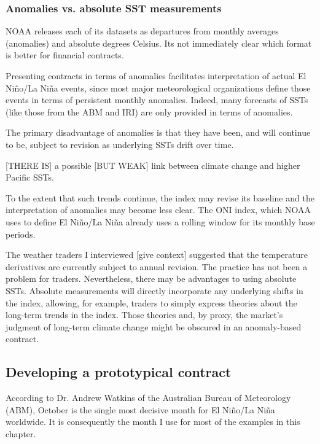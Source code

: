 \documentclass[authoryear]{article}
\begin{document}
\subsubsection{Anomalies vs. absolute SST measurements}
NOAA releases each of its datasets as departures from monthly averages (anomalies) and absolute degrees Celsius. Its not immediately clear which format is better for financial contracts.

Presenting contracts in terms of anomalies facilitates interpretation of actual El Ni\~no/La Ni\~na events, since most major meteorological organizations define those events in terms of persistent monthly anomalies. Indeed, many forecasts of SSTs (like those from the ABM and IRI) are only provided in terms of anomalies. 

The primary disadvantage of anomalies is that they have been, and will continue to be, subject to revision as underlying SSTs drift over time. 

[THERE IS] a possible [BUT WEAK] link between climate change and higher Pacific SSTs. 

To the extent that such trends continue, the index may revise its baseline and the interpretation of anomalies may become less clear. The ONI index, which NOAA uses to define El Ni\~no/La Ni\~na already uses a rolling window for its monthly base periods.

The weather traders I interviewed [give context] suggested that the temperature derivatives are currently subject to annual revision. The practice has not been a problem for traders. Nevertheless, there may be advantages to using absolute SSTs. Absolute measurements will directly incorporate any underlying shifts in the index, allowing, for example, traders to simply express theories about the long-term trends in the index. Those theories and, by proxy, the market's judgment of long-term climate change might be obscured in an anomaly-based contract.

\subsection{Developing a prototypical contract}
According to Dr. Andrew Watkins of the Australian Bureau of Meteorology (ABM), October is the single most decisive month for El Ni\~no/La Ni\~na worldwide. It is consequently the month I use for most of the examples in this chapter.
\end{document}
